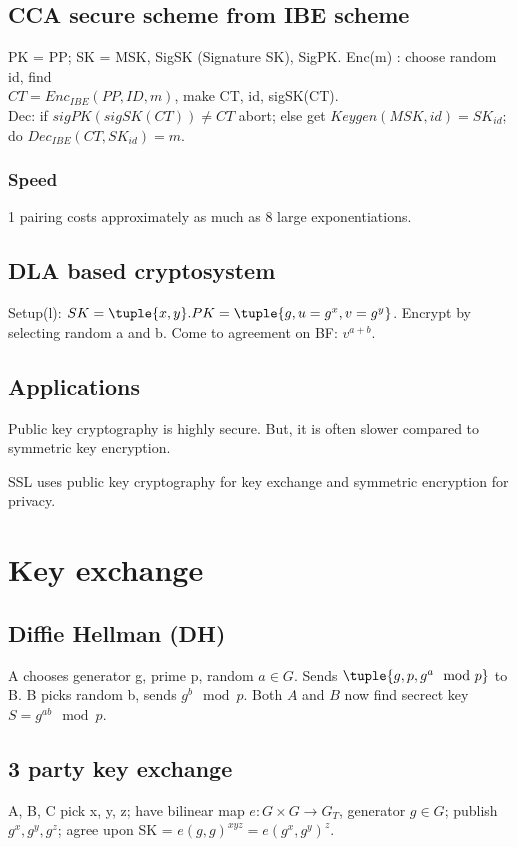 \documentclass[oneside, article]{memoir}
\begin{document}
\subsection{CCA secure scheme from IBE scheme}
PK = PP; SK = MSK, SigSK (Signature SK), SigPK. Enc(m) : choose random id, find \\
$CT = Enc_{IBE}(PP,ID,m)$, make CT, id, sigSK(CT). \\
Dec: if $sigPK(sigSK(CT)) \neq CT$ abort; else get $Keygen(MSK, id) = SK_{id}$; do $Dec_{IBE}(CT, SK_{id}) = m$.

\subsubsection{Speed}
1 pairing costs approximately as much as 8 large exponentiations.

\subsection{DLA based cryptosystem}
Setup(l): $SK = \tuple{x, y}. \\
PK = \tuple{g, u = g^{x}, v = g^{y}}$. Encrypt by selecting random a and b. Come to agreement on BF: $v^{a+b}$.

\subsection{Applications}
Public key cryptography is highly secure. But, it is often slower compared to symmetric key encryption.

SSL uses public key cryptography for key exchange and symmetric encryption for privacy.

\section{Key exchange}
\subsection{Diffie Hellman (DH)}
A chooses generator g, prime p, random $a \in G$. Sends $\tuple{g, p, g^{a} \mod p}$ to B. B picks random b, sends $g^{b} \mod p$. Both $A$ and $B$ now find secrect key $S = g^{ab} \mod p$.

\subsection{3 party key exchange}
A, B, C pick x, y, z; have bilinear map $e: G\times G \to G_{T}$, generator $g \in G$; publish $g^{x}, g^{y}, g^{z}$; agree upon SK = $e(g, g)^{xyz} = e(g^{x}, g^{y})^{z}$.
\end{document}
